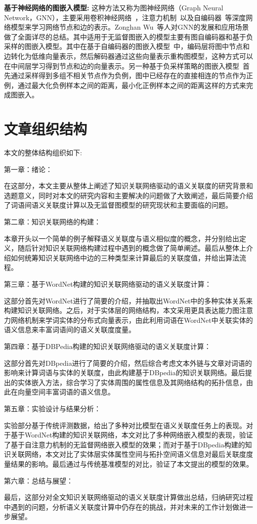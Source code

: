 \textbf{基于神经网络的图嵌入模型:}
这种方法又称为图神经网络（Graph Neural Network，GNN），主要采用卷积神经网络~\cite{MP/Yann}，注意力机制~\cite{corr/VaswaniSPUJGKP17}以及自编码器~\cite{icml/VincentLBM08}等深度网络模型来学习网络节点和边的表示。Zonghan Wu~\cite{corr/Zonghan19}等人对GNN的发展和应用场景做了全面详尽的总结。其中适用于无监督图嵌入的模型主要有图自编码器和基于负采样的图嵌入模型。其中在基于自编码器的图嵌入模型~\cite{corr/KipfW16a, ijcai/PanHLJYZ18}中，编码层将图中节点和边转化为低维向量表示，然后解码器通过这些向量表示重构图模型，这种方式可以在中间层学习得到节点和边的向量表示。另一种基于负采样策略的图嵌入模型~\cite{nips/HamiltonYL17}首先通过采样得到多组不相关节点作为负例，图中已经存在的直接相连的节点作为正例，通过最大化负例样本之间的距离，最小化正例样本之间的距离这样的方式来完成图嵌入。

\section{文章组织结构}
本文的整体结构组织如下:

第一章：绪论：

在这部分，本文主要从整体上阐述了知识关联网络驱动的语义关联度的研究背景和选题意义，同时对本文的研究内容和主要解决的问题做了大致阐述，最后简要介绍了词语间语义关联度计算以及无监督图模型的研究现状和主要面临的问题。

第二章：知识关联网络的构建：

本章开头以一个简单的例子解释语义关联度与语义相似度的概念，并分别给出定义，随后针对知识关联网络构建过程中遇到的概念做了简单阐述。最后从整体上介绍如何统筹知识关联网络中边的三种类型来计算最后的关联度值，并给出算法流程。

第三章：基于WordNet构建的知识关联网络驱动的语义关联度计算：

这部分首先对WordNet进行了简要的介绍，并抽取出WordNet中的多种实体关系来构建知识关联网络。之后，对于实体层的网络结构，本文采用更具表达能力图注意力网络机制来学词实体的分布式向量表示，由此利用词语在WordNet中关联实体的语义信息来丰富词语间的语义关联度度量。


第四章：基于DBPedia构建的知识关联网络驱动的语义关联度计算：

这部分首先对DBpedia进行了简要的介绍，然后综合考虑文本外链与文章对词语的影响来计算词语与实体的关联度，由此构建基于DBpedia的知识关联网络。最后提出的实体嵌入方法，综合学习了实体周围的属性信息及其网络结构的拓扑信息，由此在向量空间丰富词语的语义信息。

第五章：实验设计与结果分析：

实验部分基于传统评测数据，给出了多种对比模型在语义关联度任务上的表现。对于基于WordNet构建的知识关联网络，本文对比了多种网络嵌入模型的表现，验证了基于自注意力机制的无监督网络嵌入模型的效果；而对于基于DBpedia构建的知识关联网络，本文对比了实体层实体属性空间与拓扑空间语义信息对最后关联度度量结果的影响。最后通过与传统基准模型的对比，验证了本文提出的模型的效果。


第六章：总结与展望：

最后，这部分对全文知识关联网络驱动的语义关联度计算做出总结，归纳研究过程中遇到的问题，分析语义关联度计算中仍存在的挑战，并对未来的工作计划做进一步展望。

